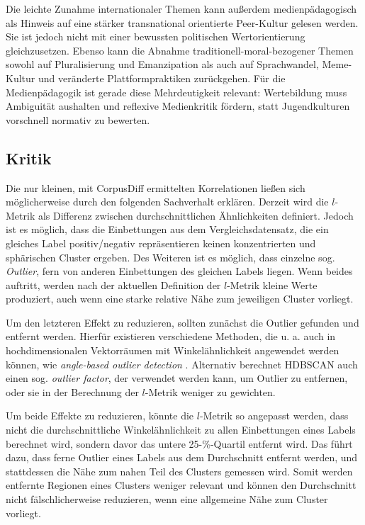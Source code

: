 Die leichte Zunahme internationaler Themen kann außerdem medienpädagogisch als Hinweis auf eine stärker transnational orientierte Peer-Kultur gelesen werden.
Sie ist jedoch nicht mit einer bewussten politischen Wertorientierung gleichzusetzen.
Ebenso kann die Abnahme traditionell-moral-bezogener Themen sowohl auf Pluralisierung und Emanzipation als auch auf Sprachwandel, Meme-Kultur und veränderte Plattformpraktiken zurückgehen.
Für die Medienpädagogik ist gerade diese Mehrdeutigkeit relevant: Wertebildung muss Ambiguität aushalten und reflexive Medienkritik \autocite{Ba99} fördern, statt Jugendkulturen vorschnell normativ zu bewerten.

\subsection{Kritik} \label{subsec:3.4}
Die nur kleinen, mit CorpusDiff ermittelten Korrelationen ließen sich möglicherweise durch den folgenden Sachverhalt erklären.
Derzeit wird die \(l\)-Metrik als Differenz zwischen durchschnittlichen Ähnlichkeiten definiert.
Jedoch ist es möglich, dass die Einbettungen aus dem Vergleichsdatensatz, die ein gleiches Label positiv/negativ repräsentieren keinen konzentrierten und sphärischen Cluster ergeben.
Des Weiteren ist es möglich, dass einzelne sog. \emph{Outlier}, fern von anderen Einbettungen des gleichen Labels liegen.
Wenn beides auftritt, werden nach der aktuellen Definition der \(l\)-Metrik kleine Werte produziert, auch wenn eine starke relative Nähe zum jeweiligen Cluster vorliegt.

Um den letzteren Effekt zu reduzieren, sollten zunächst die Outlier gefunden und entfernt werden.
Hierfür existieren verschiedene Methoden, die u. a. auch in hochdimensionalen Vektorräumen mit Winkelähnlichkeit angewendet werden können, wie \emph{angle-based outlier detection} \autocite{KSZ08}.
Alternativ berechnet HDBSCAN \autocite{MB19} auch einen sog. \emph{outlier factor}, der verwendet werden kann, um Outlier zu entfernen, oder sie in der Berechnung der \(l\)-Metrik weniger zu gewichten.

Um beide Effekte zu reduzieren, könnte die \(l\)-Metrik so angepasst werden, dass nicht die durchschnittliche Winkelähnlichkeit zu allen Einbettungen eines Labels berechnet wird, sondern davor das untere 25-\%-Quartil entfernt wird.
Das führt dazu, dass ferne Outlier eines Labels aus dem Durchschnitt entfernt werden, und stattdessen die Nähe zum nahen Teil des Clusters gemessen wird.
Somit werden entfernte Regionen eines Clusters weniger relevant und können den Durchschnitt nicht fälschlicherweise reduzieren, wenn eine allgemeine Nähe zum Cluster vorliegt.

